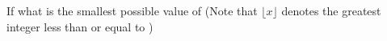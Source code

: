 If  what is the smallest possible value of  (Note that $ \lfloor x \rfloor $ denotes the greatest integer less than or equal to )